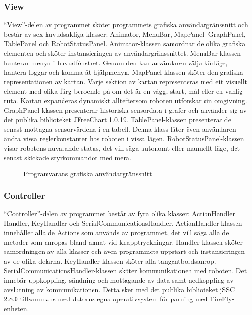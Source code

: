 \documentclass[11pt]{article}
\begin{document}
\begin{flushleft}
\subsubsection{View}
``View''-delen av programmet sköter programmets grafiska användargränssnitt och består av sex huvudsakliga klasser: Animator, MenuBar, MapPanel, GraphPanel, TablePanel och RobotStatusPanel. Animator-klassen samordnar de olika grafiska elementen och sköter instansieringen av användargränssnittet. 
MenuBar-klassen hanterar menyn i huvudfönstret. Genom den kan användaren välja körläge, hantera loggar och komma åt hjälpmenyn. 
MapPanel-klassen sköter den grafiska representationen av kartan. Varje sektion av kartan representeras med ett visuellt element med olika färg beroende på om det är en vägg, start, mål eller en vanlig ruta. Kartan expanderas dynamiskt allteftersom roboten utforskar sin omgivning. 
GraphPanel-klassen presenterar historiska sensordata i grafer och använder sig av det publika biblioteket JFreeChart 1.0.19. 
TablePanel-klassen presenterar de senast mottagna sensorvärdena i en tabell. Denna klass låter även användaren ändra vissa reglerkonstanter hos roboten i vissa lägen.
RobotStatusPanel-klassen visar robotens nuvarande status, det vill säga autonomt eller manuellt läge, det senast skickade styrkommandot med mera.

\begin{figure}[H]
\centering
\noindent{}
	\caption{Programvarans grafiska användargränssnitt\label{software}}	
\end{figure}

\subsubsection{Controller}
``Controller''-delen av programmet består av fyra olika klasser: ActionHandler, Handler, KeyHandler och SerialCommunicationsHandler. 
ActionHandler-klassen innehåller alla de Actions som används av programmet, det vill säga alla de metoder som anropas bland annat vid knapptryckningar.
Handler-klassen sköter samordningen av alla klasser och även programmets uppstart och instansieringen av de olika delarna.
KeyHandler-klassen sköter alla tangentbordsanrop.
SerialCommunicationsHandler-klassen sköter kommunikationen med roboten. Det innebär uppkoppling, sändning och mottagande av data samt nedkoppling av avslutning av kommunikationen. Detta sker med det publika biblioteket jSSC 2.8.0 tillsammans med datorns egna operativsystem för parning med FireFly-enheten.


\end{flushleft}
\end{document}
